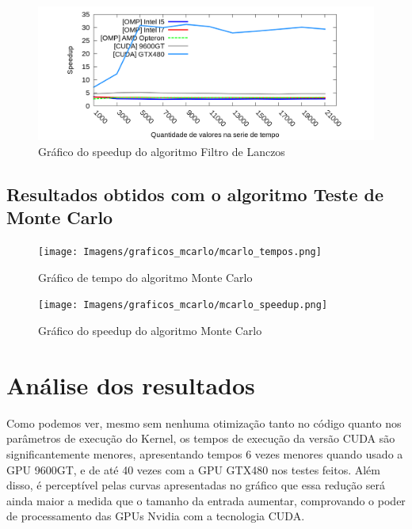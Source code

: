 \begin{figure}[H]
\centering
\includegraphics[width=1.0\textwidth]{Imagens/graficos_lanczos/lanczos_speedup.png}
\caption{Gráfico do speedup do algoritmo Filtro de Lanczos}
\label{fig:grafico_speedup_lanczos}
\end{figure}

\subsection{Resultados obtidos com o algoritmo Teste de Monte Carlo}

\begin{figure}[H]
\centering
\texttt{[image: Imagens/graficos\_mcarlo/mcarlo\_tempos.png]}
\caption{Gráfico de tempo do algoritmo Monte Carlo}
\label{fig:grafico_tempo_mcarlo}
\end{figure}

\begin{figure}[H]
\centering
\texttt{[image: Imagens/graficos\_mcarlo/mcarlo\_speedup.png]}
\caption{Gráfico do speedup do algoritmo Monte Carlo}
\label{fig:grafico_speedup_mcarlo}
\end{figure}

\section{Análise dos resultados}

Como podemos ver, mesmo sem nenhuma otimização tanto no código quanto nos parâmetros de execução do Kernel, os tempos de execução da versão CUDA são significantemente menores, apresentando tempos 6 vezes menores quando usado a GPU 9600GT, e de até 40 vezes com a GPU GTX480 nos testes feitos. Além disso, é perceptível pelas curvas apresentadas no gráfico que essa redução será ainda maior a medida que o tamanho da entrada aumentar, comprovando o poder de processamento das GPUs Nvidia com a tecnologia CUDA.